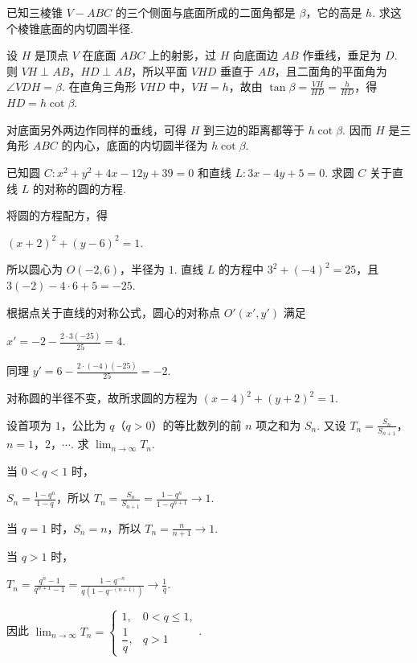 \begin{problem}

已知三棱锥 \(V-ABC\) 的三个侧面与底面所成的二面角都是 \(\beta\)，它的高是 \(h\). 求这个棱锥底面的内切圆半径.
\end{problem}

\begin{solution}
设 \(H\) 是顶点 \(V\) 在底面 \(ABC\) 上的射影，过 \(H\) 向底面边 \(AB\) 作垂线，垂足为 \(D\). 则 \(VH\perp AB\)，\(HD\perp AB\)，所以平面 \(VHD\) 垂直于 \(AB\)，且二面角的平面角为 \(\angle VDH=\beta\). 在直角三角形 \(VHD\) 中，\(VH=h\)，故由 \(\tan\beta=\frac{VH}{HD}=\frac{h}{HD}\)，得 \(HD=h\cot\beta\).

对底面另外两边作同样的垂线，可得 \(H\) 到三边的距离都等于 \(h\cot\beta\). 因而 \(H\) 是三角形 \(ABC\) 的内心，底面的内切圆半径为 \(h\cot\beta\).
\end{solution}

\begin{problem}

已知圆 \(C:x^2+y^2+4x-12y+39=0\) 和直线 \(L:3x-4y+5=0\). 求圆 \(C\) 关于直线 \(L\) 的对称的圆的方程.
\end{problem}

\begin{solution}
将圆的方程配方，得

\(\left(x+2\right)^2+\left(y-6\right)^2=1\).

所以圆心为 \(O\left(-2,6\right)\)，半径为 \(1\). 直线 \(L\) 的方程中 \(3^2+\left(-4\right)^2=25\)，且
\(3\left(-2\right)-4\cdot6+5=-25\).

根据点关于直线的对称公式，圆心的对称点 \(O'\left(x',y'\right)\) 满足

\(x'=-2-\frac{2\cdot3\left(-25\right)}{25}=4\).

同理 \(y'=6-\frac{2\cdot\left(-4\right)\left(-25\right)}{25}=-2\).

对称圆的半径不变，故所求圆的方程为 \(\left(x-4\right)^2+\left(y+2\right)^2=1\).
\end{solution}

\begin{problem}

设首项为 \(1\)，公比为 \(q\)（\(q>0\)）的等比数列的前 \(n\) 项之和为 \(S_n\). 又设 \(T_n=\frac{S_n}{S_{n+1}}\)，\(n=1\)，\(2\)，\(\cdots\). 求 \(\displaystyle\lim_{n\to\infty} T_n\).
\end{problem}

\begin{solution}
当 \(0<q<1\) 时，

\(S_n=\frac{1-q^n}{1-q}\)，所以 \(T_n=\frac{S_n}{S_{n+1}}=\frac{1-q^n}{1-q^{n+1}}\longrightarrow1\).

当 \(q=1\) 时，\(S_n=n\)，所以 \(T_n=\frac{n}{n+1}\longrightarrow1\).

当 \(q>1\) 时，

\(T_n=\frac{q^n-1}{q^{n+1}-1}=\frac{1-q^{-n}}{q\left(1-q^{-(n+1)}\right)}\longrightarrow\frac{1}{q}\).

因此 \(\displaystyle\lim_{n\to\infty}T_n=\begin{cases}
1, & 0<q\leqslant1,\\
\dfrac{1}{q}, & q>1
\end{cases}\).
\end{solution}
